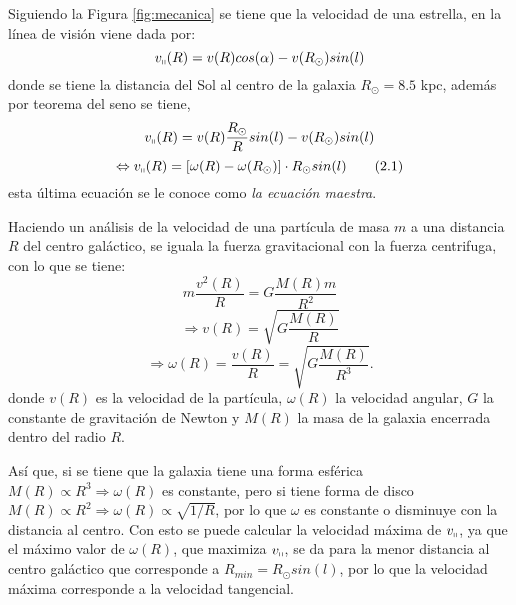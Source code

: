 \documentclass[letterpaper,oneside]{article}
\begin{document}
Siguiendo la Figura \ref{fig:mecanica} se tiene que la velocidad de una estrella, en la línea de visión viene dada por:
\begin{equation*}
v_{\shortparallel}(R)=v(R)cos(\alpha)-v(R_{\odot})sin(l)
\end{equation*}
donde se tiene la distancia del Sol al centro de la galaxia $R_{\odot}=8.5$ kpc, además por teorema del seno se tiene,
\begin{equation*}
v_{\shortparallel}(R)=v(R)\frac{R_{\odot}}{R}sin(l)-v(R_{\odot})sin(l)\\
\end{equation*}
\[
\Leftrightarrow v_{\shortparallel}(R)=[\omega(R)-\omega(R_{\odot})]	\cdot R_{\odot}sin(l) \tag{2.1} \label{eq:ec-maestra}
\]
esta última ecuación se le conoce como \textit{la ecuación maestra}.

Haciendo un análisis de la velocidad de una partícula de masa $m$ a una distancia $R$ del centro galáctico, se iguala la fuerza gravitacional con la fuerza centrifuga, con lo que se tiene:
\[
m\frac{v^2(R)}{R}=G\frac{M(R)m}{R^2}
\]
\[
 \Rightarrow v(R)=\sqrt{G\frac{M(R)}{R}} \tag{2.2} \label{eq:velocidad}
\]
\[
 \Rightarrow \omega(R)=\frac{v(R)}{R}=\sqrt{G\frac{M(R)}{R^3}}.  \tag{2.3} \label{eq:omega}
\]
donde $v(R)$ es la velocidad de la partícula, $\omega(R)$ la velocidad angular, $G$ la constante de gravitación de Newton y $M(R)$ la masa de la galaxia encerrada dentro del radio $R$.

Así que, si se tiene que la galaxia tiene una forma esférica $M(R) \propto R^3\Rightarrow\omega(R)$ es constante, pero si tiene forma de disco $M(R) \propto R^2\Rightarrow\omega(R)\propto \sqrt{1/R}$, por lo que $\omega$ es constante o disminuye con la distancia al centro. Con esto se puede calcular la velocidad máxima de $v_{\shortparallel}$, ya que el máximo valor de  $\omega(R)$, que maximiza $v_{\shortparallel}$, se da para la menor distancia al centro galáctico que corresponde a $R_{min}=R_{\odot}sin(l)$, por lo que la velocidad máxima corresponde a la velocidad tangencial.
\end{document}
